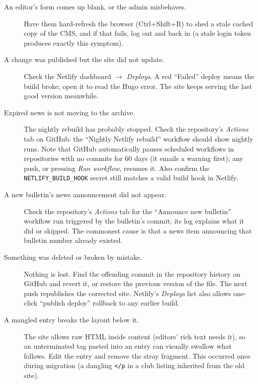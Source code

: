 \documentclass[12pt,letterpaper]{article}
\begin{document}
\begin{description}
  \item[An editor's form comes up blank, or the admin misbehaves.] Have
  them hard-refresh the browser (Ctrl+Shift+R) to shed a stale cached copy
  of the CMS, and if that fails, log out and back in (a stale login token
  produces exactly this symptom).

  \item[A change was published but the site did not update.] Check the
  Netlify dashboard $\rightarrow$ \emph{Deploys}. A red ``Failed'' deploy
  means the build broke; open it to read the Hugo error. The site keeps
  serving the last good version meanwhile.

  \item[Expired news is not moving to the archive.] The nightly rebuild has
  probably stopped. Check the repository's \emph{Actions} tab on GitHub:
  the ``Nightly Netlify rebuild'' workflow should show nightly runs. Note
  that GitHub automatically pauses scheduled workflows in repositories with
  no commits for 60 days (it emails a warning first); any push, or pressing
  \emph{Run workflow}, resumes it. Also confirm the
  \texttt{NETLIFY\_BUILD\_HOOK} secret still matches a valid build hook in
  Netlify.

  \item[A new bulletin's news announcement did not appear.] Check the
  repository's \emph{Actions} tab for the ``Announce new bulletin''
  workflow run triggered by the bulletin's commit; its log explains what it
  did or skipped. The commonest cause is that a news item announcing that
  bulletin number already existed.

  \item[Something was deleted or broken by mistake.] Nothing is lost. Find
  the offending commit in the repository history on GitHub and revert it,
  or restore the previous version of the file. The next push republishes
  the corrected site. Netlify's \emph{Deploys} list also allows one-click
  ``publish deploy'' rollback to any earlier build.

  \item[A mangled entry breaks the layout below it.] The site allows raw
  HTML inside content (editors' rich text needs it), so an unterminated tag
  pasted into an entry can visually swallow what follows. Edit the entry
  and remove the stray fragment. This occurred once during migration
  (a dangling \texttt{</p} in a club listing inherited from the old site).
\end{description}
\end{document}
